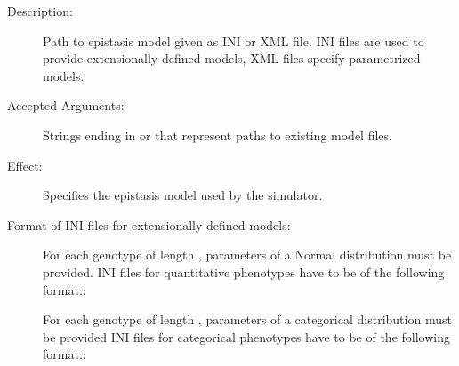 \documentclass[a4paper,10pt,english]{sphinxhowto}
\begin{document}
\begin{description}
\begin{description}
\begin{description}
\end{description}

\item[{\sphinxcode{\sphinxupquote{-{-}model MODEL}}}] \leavevmode\begin{description}
\item[{Description:}] \leavevmode
Path to epistasis model given as INI or XML file.
INI files are used to provide extensionally defined models, XML files specify parametrized models.

\item[{Accepted Arguments:}] \leavevmode
Strings ending in  or  that represent paths to existing model files.

\item[{Effect:}] \leavevmode
Specifies the epistasis model used by the simulator.

\item[{Format of INI files for extensionally defined models:}] \leavevmode
For each genotype of length , parameters of a Normal distribution must be provided.
INI files for quantitative phenotypes have to be of the following format::

\begin{sphinxVerbatim}[commandchars=\\\{\}]
\PYG{p}{[} \PYG{p}{]}
  
  
\PYG{p}{[} \PYG{p}{]}
  
  
\end{sphinxVerbatim}

For each genotype of length , parameters of a categorical distribution must be provided
INI files for categorical phenotypes have to be of the following format::


\end{description}
\end{description}
\end{description}
\end{document}
